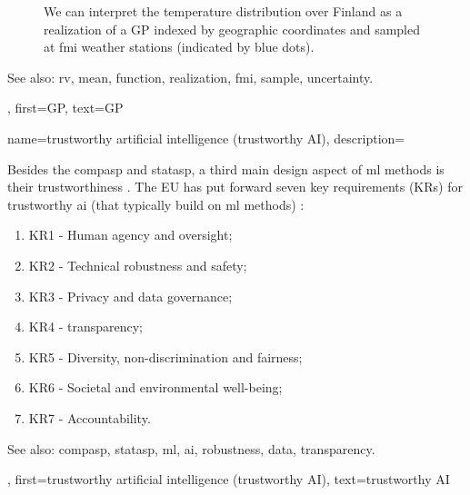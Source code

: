 {{\begin{figure}[H]
\begin{center}
\vspace*{-15mm}
\end{center}
\caption{We can interpret the temperature distribution over Finland as a \gls{realization} 
	of a GP indexed by geographic coordinates and sampled at \gls{fmi} weather stations (indicated by 
	blue dots). \label{fig_gp_FMI}}
\end{figure}
See also: \gls{rv}, \gls{mean}, \gls{function}, \gls{realization}, \gls{fmi}, \gls{sample}, \gls{uncertainty}.}, 
first={GP}, 
text={GP}
}

{name={trustworthy artificial intelligence (trustworthy AI)},
	description={Besides the \gls{compasp} and \gls{statasp}, a third main design aspect of 
		\gls{ml} methods is their trustworthiness \cite{pfau2024engineeringtrustworthyaideveloper}. 
		The EU has put forward seven key requirements (KRs) for trustworthy 
		\gls{ai} (that typically build on \gls{ml} methods) \cite{ALTAIEU}: 
	\begin{enumerate}[label=\arabic*)]
		\item KR1 - Human agency and oversight;
		\item KR2 - Technical \gls{robustness} and safety;
		\item KR3 - Privacy and \gls{data} governance;
		\item KR4 - \Gls{transparency};
		\item KR5 - Diversity, non-discrimination and fairness; 
		\item KR6 - Societal and environmental well-being;
		\item KR7 - Accountability. 
	\end{enumerate}
		See also: \gls{compasp}, \gls{statasp}, \gls{ml}, \gls{ai}, \gls{robustness}, \gls{data}, \gls{transparency}.},
	first={trustworthy artificial intelligence (trustworthy AI)},
	text={trustworthy AI}
}

